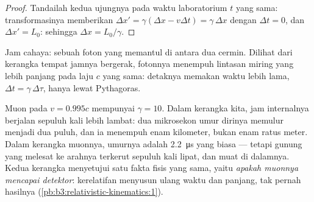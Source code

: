 \begin{proof}
Tandailah kedua ujungnya pada waktu laboratorium $t$ yang sama:
transformasinya memberikan
$\Delta x' = \gamma(\Delta x - v\Delta t) = \gamma\,\Delta x$ dengan
$\Delta t = 0$, dan $\Delta x' = L_0$: sehingga $\Delta x = L_0/\gamma$.
\end{proof}

\begin{omfigure}

{\small Jam cahaya: sebuah foton yang memantul di antara dua cermin.
Dilihat dari kerangka tempat jamnya bergerak, fotonnya menempuh
lintasan miring yang lebih panjang pada laju $c$ yang sama: detaknya
memakan waktu lebih lama, $\Delta t = \gamma\,\Delta\tau$, hanya lewat
Pythagoras.}
\end{omfigure}

\begin{example}\label{ex:b3:relativistic-kinematics:muon}
Muon pada $v = 0.995c$ mempunyai $\gamma = 10$. Dalam kerangka kita, jam
internalnya berjalan sepuluh kali lebih lambat: dua mikrosekon umur
dirinya memulur menjadi dua puluh, dan ia menempuh enam kilometer,
bukan enam ratus meter. Dalam kerangka muonnya, umurnya adalah
\qty{2.2}{\micro s} yang biasa --- tetapi gunung yang melesat ke
arahnya terkerut sepuluh kali lipat, dan muat di dalamnya. Kedua
kerangka menyetujui satu fakta fisis yang sama, yaitu \emph{apakah
muonnya mencapai detektor}: kerelatifan menyusun ulang waktu dan
panjang, tak pernah hasilnya (\cref{pb:b3:relativistic-kinematics:1}).
\end{example}

